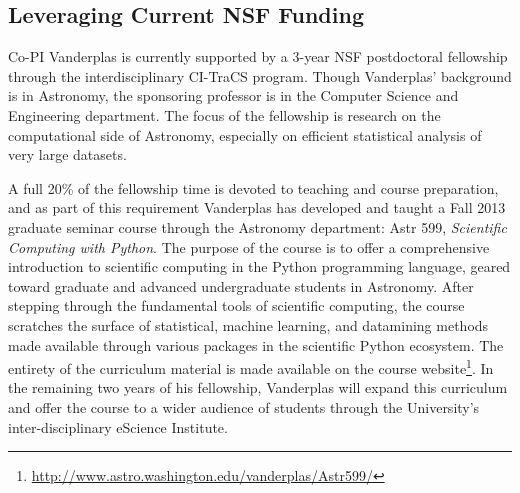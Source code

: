 \subsection{Leveraging Current NSF Funding}
\label{sec:Jake}

Co-PI Vanderplas is currently supported by a 3-year NSF postdoctoral
fellowship through the interdisciplinary CI-TraCS program.  Though
Vanderplas' background is in Astronomy, the sponsoring professor is in
the Computer Science and Engineering department.  The focus of the
fellowship is research on the computational side of Astronomy, especially
on efficient statistical analysis of very large datasets.

A full 20\% of the fellowship time is devoted to teaching and course
preparation, and as part of this requirement Vanderplas has developed
and taught a Fall 2013
graduate seminar course through the Astronomy department:
Astr 599, {\it Scientific Computing with Python}.  The purpose of the
course is to offer a comprehensive introduction to scientific computing
in the Python programming language, geared toward graduate 
and advanced undergraduate students in Astronomy.
After stepping through the fundamental tools of scientific computing,
the course scratches the surface of statistical, machine learning, and
datamining methods made available through various packages in the scientific
Python ecosystem. The entirety of
the curriculum material is made available on the course website\footnote{
\url{http://www.astro.washington.edu/vanderplas/Astr599/}}.
In the remaining two years of his fellowship, Vanderplas will expand this
curriculum and offer the course to a wider audience of students through
the University's inter-disciplinary eScience Institute.

